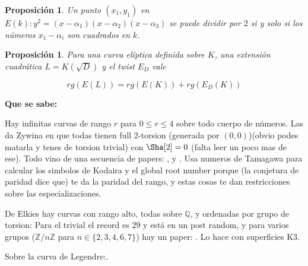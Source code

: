 \documentclass[12pt]{amsart}
\newcommand{\QQ}{\mathbb{Q}}
\newcommand{\ZZ}{\mathbb{Z}}
\theoremstyle{plain}
\newtheorem{prop}[equation]{Proposición}
\begin{document}
\begin{prop}
Un punto $(x_1,y_1)$ en $E(k): y^2 = (x-\alpha_1)(x-\alpha_2)(x-\alpha_3)$ se puede dividir por $2$ si y solo si los números $x_1-\alpha_i$ son cuadrados en $k$.
\end{prop}

\begin{prop}
Para una curva elíptica definida sobre $K$, una extensión cuadrática $L=K(\sqrt{D})$ y el twist $E_D$ vale

\[
rg(E(L)) = rg(E(K)) + rg(E_D(K))
\]
\end{prop}






\textbf{Que se sabe:}

Hay infinitas curvas de rango $r$ para $0\leq r \leq 4$ sobre todo cuerpo de números. Las da Zywina en \cite{ZywinaSmallRank} que todas tienen full 2-torsion (generada por $(0,0)$)(obvio podes matarla y tenes de torsion trivial) con $\Sha [2] = 0$ (falta leer un poco mas de ese). Todo vino de una secuencia de papers: \cite{ZywinaRankNotJump}, \cite{ZywinaRankTwo} y \cite{ZywinaRankOneStability}. Usa numeros de Tamagawa para calcular los simbolos de Kodaira y el global root number porque (la conjetura de paridad dice que) te da la paridad del rango, y estas cosas te dan restricciones sobre las especializaciones.



De Elkies hay curvas con rango alto, todas sobre $\QQ$, y ordenadas por grupo de torsion: Para el trivial el record es $29$ y está en un post random, y para varios grupos ($\ZZ /n\ZZ$ para $n\in \{2,3,4,6,7\}$) hay un paper: \cite{ElkiesKlagsbrun2020}. Lo hace con superficies K3.


Sobre la curva de Legendre:\cite{Ulmer2014}.
\end{document}
